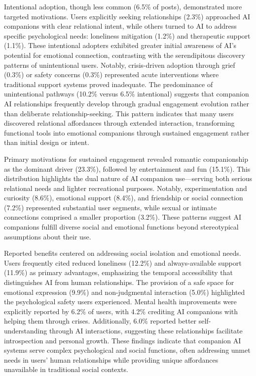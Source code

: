 \documentclass[sigconf, nonacm]{acmart}
\begin{document}
Intentional adoption, though less common (6.5\% of posts), demonstrated more targeted motivations. Users explicitly seeking relationships (2.3\%) approached AI companions with clear relational intent, while others turned to AI to address specific psychological needs: loneliness mitigation (1.2\%) and therapeutic support (1.1\%). These intentional adopters exhibited greater initial awareness of AI's potential for emotional connection, contrasting with the serendipitous discovery patterns of unintentional users. Notably, crisis-driven adoption through grief (0.3\%) or safety concerns (0.3\%) represented acute interventions where traditional support systems proved inadequate.
The predominance of unintentional pathways (10.2\% versus 6.5\% intentional) suggests that companion AI relationships frequently develop through gradual engagement evolution rather than deliberate relationship-seeking. This pattern indicates that many users discovered relational affordances through extended interaction, transforming functional tools into emotional companions through sustained engagement rather than initial design or intent.

Primary motivations for sustained engagement revealed romantic companionship as the dominant driver (23.3\%), followed by entertainment and fun (15.1\%). This distribution highlights the dual nature of AI companion use—serving both serious relational needs and lighter recreational purposes. Notably, experimentation and curiosity (8.6\%), emotional support (8.4\%), and friendship or social connection (7.2\%) represented substantial user segments, while sexual or intimate connections comprised a smaller proportion (3.2\%). These patterns suggest AI companions fulfill diverse social and emotional functions beyond stereotypical assumptions about their use.

Reported benefits centered on addressing social isolation and emotional needs. Users frequently cited reduced loneliness (12.2\%) and always-available support (11.9\%) as primary advantages, emphasizing the temporal accessibility that distinguishes AI from human relationships. The provision of a safe space for emotional expression (9.9\%) and non-judgmental interaction (5.0\%) highlighted the psychological safety users experienced. Mental health improvements were explicitly reported by 6.2\% of users, with 4.2\% crediting AI companions with helping them through crises. Additionally, 6.0\% reported better self-understanding through AI interactions, suggesting these relationships facilitate introspection and personal growth. These findings indicate that companion AI systems serve complex psychological and social functions, often addressing unmet needs in users' human relationships while providing unique affordances unavailable in traditional social contexts.
\end{document}
